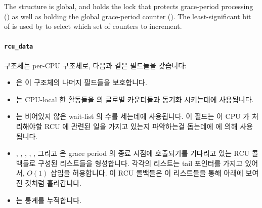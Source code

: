 The  structure is global, and holds the lock
that protects grace-period processing () as well
as holding the global grace-period counter ().
The least-significant bit of  is used by
 to select which set of counters to increment.
\fi

\paragraph{{\tt rcu\_data}}
\label{app:rcuimpl:rcu_data}

 구조체는 per-CPU 구조체로, 다음과 같은 필드들을 갖습니다:

\begin{itemize}
\item	{} 은 이 구조체의 나머지 필드들을 보호합니다.
\item	{} 는 CPU-local 한 활동들을  의 글로벌
	카운터들과 동기화 시키는데에 사용됩니다.
\item	{} 는 비어있지 않은 wait-list 의 수를 세는데에
	사용됩니다.
	이 필드는 이 CPU 가 처리해야할 RCU 에 관련된 일을 가지고 있는지
	파악하는걸 돕는데에  에 의해 사용됩니다.
\item	{}, , ,
	, , 그리고
	 은 grace period 의 종료 시점에 호출되기를 기다리고 있는
	RCU 콜백들로 구성된 리스트들을 형성합니다.
	각각의 리스트는 tail 포인터를 가지고 있어서, $O\left(1\right)$ 삽입을
	허용합니다.
	이 RCU 콜백들은 이 리스트들을 통해 아래에 보여진 것처럼 흘러갑니다.
\item	{} 는 통계를 누적합니다.

\end{itemize}

